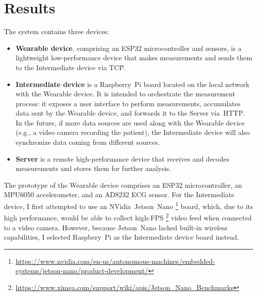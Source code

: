 \documentclass[lettersize,journal]{IEEEtran}
\begin{document}
\section{Results}

The system contains three devices:

\begin{itemize}
    \item \textbf{Wearable device}, comprising an ESP32 microcontroller and sensors,
          is a lightweight low-performance device that makes measurements
          and sends them to the Intermediate device via TCP.

    \item \textbf{Intermediate device} is a Raspberry~Pi board located on the local
          network with the Wearable device. It is intended to orchestrate the measurement
          process: it exposes a user interface to perform measurements, accumulates
          data sent by the Wearable device, and forwards it to the Server via~HTTP.
          \\
          In the future, if more data sources are used along with the Wearable device
          (e.g., a video camera recording the patient), the Intermediate device will also
          synchronize data coming from different sources.

    \item \textbf{Server} is a remote high-performance device that receives and decodes
          measurements and stores them for further analysis.
\end{itemize}

The prototype of the Wearable device comprises an ESP32 microcontroller, an MPU6050
accelerometer, and an AD8232 ECG sensor. For the Intermediate device, I first attempted to
use an
NVidia\textsuperscript{\textregistered}~Jetson~Nano{\texttrademark}
\footnote{\url{https://www.nvidia.com/en-us/autonomous-machines/embedded-systems/jetson-nano/product-development/}}
board, which, due to its high performance, would be able to collect high-FPS
\footnote{\url{https://www.ximea.com/support/wiki/apis/Jetson_Nano_Benchmarks}} video feed when
connected to a video camera. However, because Jetson~Nano lacked built-in wireless capabilities,
I selected Raspbery~Pi as the Intermediate device board instead.
\end{document}

